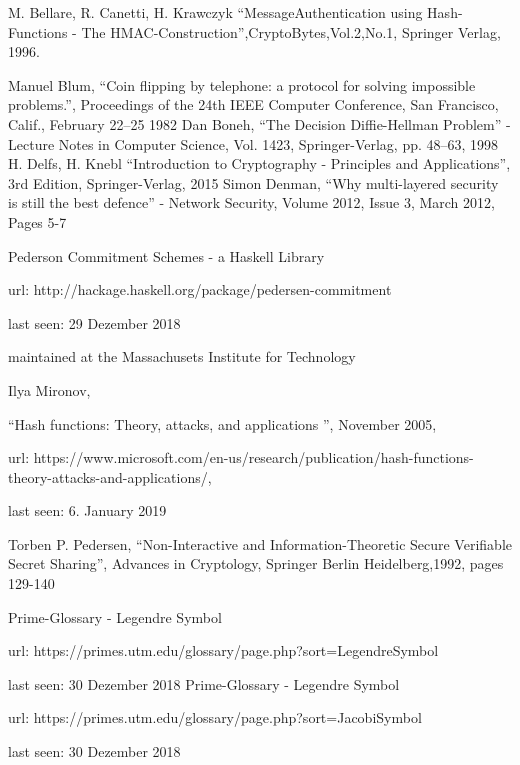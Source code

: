 \begin{thebibliography}{00}
	 M. Bellare, R. Canetti, H. Krawczyk ``MessageAuthentication using Hash-Functions - The HMAC-Construction'',CryptoBytes,Vol.2,No.1, Springer Verlag, 1996.
	
	Manuel Blum, ``Coin flipping by telephone: a protocol for solving impossible
	problems.'', Proceedings of the 24th IEEE Computer Conference, San Francisco,
	Calif., February 22–25 1982	
	 Dan Boneh, ``The Decision Diffie-Hellman Problem'' - Lecture Notes in Computer Science, Vol. 1423, Springer-Verlag, pp. 48--63, 1998 
	 H. Delfs, H. Knebl ``Introduction to Cryptography - Principles and Applications'', 3rd Edition, Springer-Verlag, 2015
	 Simon Denman, ``Why multi-layered security is still the best defence'' - Network Security, Volume 2012, Issue 3, March 2012, Pages 5-7
	
	 Pederson Commitment Schemes - a Haskell Library 
	
	url: http://hackage.haskell.org/package/pedersen-commitment 
	
	last seen: 29 Dezember 2018 
	
	maintained at the Massachusets Institute for Technology
	
	 Ilya Mironov, 
	
	``Hash functions: Theory, attacks, and applications '',  November 2005,
	
	url: https://www.microsoft.com/en-us/research/publication/hash-functions-theory-attacks-and-applications/,
	
	last seen: 6. January 2019
	
	 Torben P. Pedersen, ``Non-Interactive and Information-Theoretic Secure Verifiable Secret Sharing'',
	Advances in Cryptology, Springer Berlin Heidelberg,1992,
	pages 129-140

	 Prime-Glossary - Legendre Symbol

	url: https://primes.utm.edu/glossary/page.php?sort=LegendreSymbol
	
	last seen: 30 Dezember 2018
	 Prime-Glossary - Legendre Symbol
	
	url: https://primes.utm.edu/glossary/page.php?sort=JacobiSymbol
	
	last seen: 30 Dezember 2018
\end{thebibliography}
\vspace{12pt}